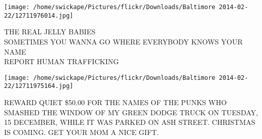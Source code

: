 \documentclass[10pt,letterpaper]{article}
\begin{document}
\vspace{0.25in}
\texttt{[image: /home/swickape/Pictures/flickr/Downloads/Baltimore 2014-02-22/12711976014.jpg]}

THE REAL JELLY BABIES\\
SOMETIMES YOU WANNA GO WHERE EVERYBODY KNOWS YOUR NAME\\
REPORT HUMAN TRAFFICKING\\
\pagebreak

\texttt{[image: /home/swickape/Pictures/flickr/Downloads/Baltimore 2014-02-22/12711975164.jpg]}

REWARD QUIET \$50.00 FOR THE NAMES OF THE PUNKS WHO SMASHED THE WINDOW OF MY GREEN DODGE TRUCK ON TUESDAY, 15 DECEMBER, WHILE IT WAS PARKED ON ASH STREET.  CHRISTMAS IS COMING.  GET YOUR MOM A NICE GIFT.\\
\pagebreak
\end{document}
